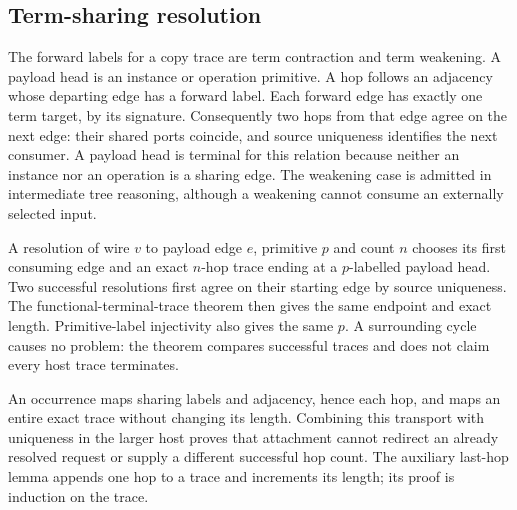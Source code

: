 \subsection{Term-sharing resolution}

The forward labels for a copy trace are term contraction and term weakening.
A payload head is an instance or operation primitive. A hop follows an
adjacency whose departing edge has a forward label. Each forward edge has
exactly one term target, by its signature. Consequently two hops from that
edge agree on the next edge: their shared ports coincide, and source
uniqueness identifies the next consumer. A payload head is terminal for this
relation because neither an instance nor an operation is a sharing edge.
The weakening case is admitted in intermediate tree reasoning, although a
weakening cannot consume an externally selected input.







A resolution of wire $v$ to payload edge $e$, primitive $p$ and count $n$
chooses its first consuming edge and an exact $n$-hop trace ending at a
$p$-labelled payload head. Two successful resolutions first agree on their
starting edge by source uniqueness. The functional-terminal-trace theorem
then gives the same endpoint and exact length. Primitive-label injectivity
also gives the same $p$. A surrounding cycle causes no problem: the theorem
compares successful traces and does not claim every host trace terminates.



An occurrence maps sharing labels and adjacency, hence each hop, and maps
an entire exact trace without changing its length. Combining this transport
with uniqueness in the larger host proves that attachment cannot redirect an
already resolved request or supply a different successful hop count. The
auxiliary last-hop lemma appends one hop to a trace and increments its length;
its proof is induction on the trace.


